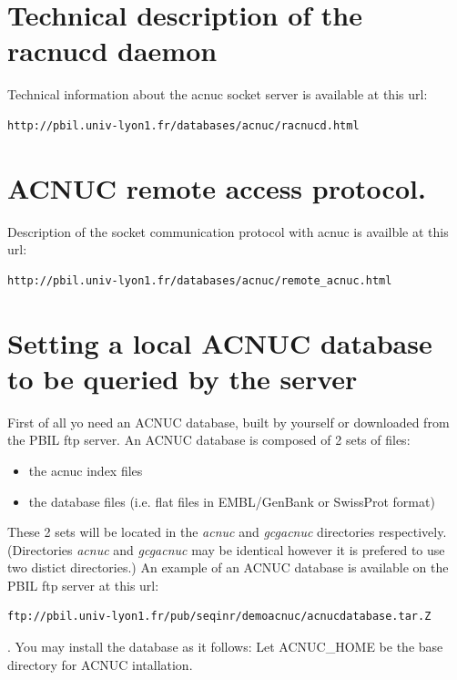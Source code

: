 \documentclass{article}
\begin{document}
\section{Technical description of the racnucd daemon}
Technical information about the acnuc socket server is available at this url:
\begin{verbatim}
http://pbil.univ-lyon1.fr/databases/acnuc/racnucd.html
\end{verbatim}

\section{ACNUC remote access protocol.}
Description of the socket communication protocol with acnuc is availble at this url:
\begin{verbatim}
http://pbil.univ-lyon1.fr/databases/acnuc/remote_acnuc.html
\end{verbatim}


\section{Setting a local ACNUC database to be queried by the server}

First of all yo need an ACNUC database, built by yourself or  downloaded from the PBIL ftp server.
An ACNUC database is composed of 2 sets of files:
\begin{itemize}
	\item  the acnuc index files 
	\item  the database files (i.e. flat files in EMBL/GenBank or SwissProt format)
\end{itemize}

These 2 sets will be located  in the \textit{acnuc} and  \textit{gcgacnuc} directories  respectively.
(Directories \textit{acnuc} and  \textit{gcgacnuc} may be identical however it is prefered to use two distict directories.)
An example of an ACNUC database is available on the PBIL ftp server  at this url:
\begin{verbatim}
ftp://pbil.univ-lyon1.fr/pub/seqinr/demoacnuc/acnucdatabase.tar.Z
\end{verbatim}. 
You may install the database as it follows:
Let ACNUC\_HOME be the base directory for ACNUC intallation.
\end{document}
